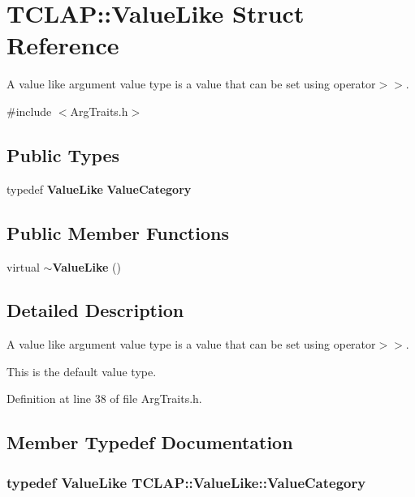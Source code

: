 \section{T\+C\+L\+A\+P\+:\+:Value\+Like Struct Reference}
\label{structTCLAP_1_1ValueLike}


A value like argument value type is a value that can be set using operator$>$$>$.  




{\ttfamily \#include $<$Arg\+Traits.\+h$>$}

\subsection*{Public Types}
\begin{DoxyCompactItemize}
\item 
typedef {\bf Value\+Like} {\bf Value\+Category}
\end{DoxyCompactItemize}
\subsection*{Public Member Functions}
\begin{DoxyCompactItemize}
\item 
virtual {\bf $\sim$\+Value\+Like} ()
\end{DoxyCompactItemize}


\subsection{Detailed Description}
A value like argument value type is a value that can be set using operator$>$$>$. 

This is the default value type. 

Definition at line 38 of file Arg\+Traits.\+h.



\subsection{Member Typedef Documentation}
\subsubsection[{Value\+Category}]{\setlength{\rightskip}{0pt plus 5cm}typedef {\bf Value\+Like} {\bf T\+C\+L\+A\+P\+::\+Value\+Like\+::\+Value\+Category}}\label{structTCLAP_1_1ValueLike_a26e6d3b8c4a608ecebe7404e42fbecf9}


